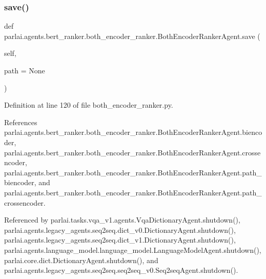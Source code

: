 \subsubsection{\texorpdfstring{save()}{save()}}
{\footnotesize\ttfamily def parlai.\+agents.\+bert\+\_\+ranker.\+both\+\_\+encoder\+\_\+ranker.\+Both\+Encoder\+Ranker\+Agent.\+save (\begin{DoxyParamCaption}\item[{}]{self,  }\item[{}]{path = {\ttfamily None} }\end{DoxyParamCaption})}



Definition at line 120 of file both\+\_\+encoder\+\_\+ranker.\+py.



References parlai.\+agents.\+bert\+\_\+ranker.\+both\+\_\+encoder\+\_\+ranker.\+Both\+Encoder\+Ranker\+Agent.\+biencoder, parlai.\+agents.\+bert\+\_\+ranker.\+both\+\_\+encoder\+\_\+ranker.\+Both\+Encoder\+Ranker\+Agent.\+crossencoder, parlai.\+agents.\+bert\+\_\+ranker.\+both\+\_\+encoder\+\_\+ranker.\+Both\+Encoder\+Ranker\+Agent.\+path\+\_\+biencoder, and parlai.\+agents.\+bert\+\_\+ranker.\+both\+\_\+encoder\+\_\+ranker.\+Both\+Encoder\+Ranker\+Agent.\+path\+\_\+crossencoder.



Referenced by parlai.\+tasks.\+vqa\+\_\+v1.\+agents.\+Vqa\+Dictionary\+Agent.\+shutdown(), parlai.\+agents.\+legacy\+\_\+agents.\+seq2seq.\+dict\+\_\+v0.\+Dictionary\+Agent.\+shutdown(), parlai.\+agents.\+legacy\+\_\+agents.\+seq2seq.\+dict\+\_\+v1.\+Dictionary\+Agent.\+shutdown(), parlai.\+agents.\+language\+\_\+model.\+language\+\_\+model.\+Language\+Model\+Agent.\+shutdown(), parlai.\+core.\+dict.\+Dictionary\+Agent.\+shutdown(), and parlai.\+agents.\+legacy\+\_\+agents.\+seq2seq.\+seq2seq\+\_\+v0.\+Seq2seq\+Agent.\+shutdown().

